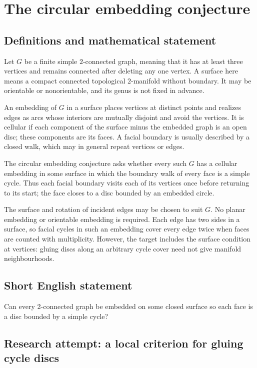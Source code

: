 \documentclass[11pt,a4paper]{article}
\begin{document}
\section*{The circular embedding conjecture}\label{statement}

\subsection{Definitions and mathematical statement}
Let $G$ be a finite simple $2$-connected graph, meaning that
it has at least three vertices and remains connected after
deleting any one vertex. A surface here means a compact
connected topological $2$-manifold without boundary. It may be
orientable or nonorientable, and its genus is not fixed in
advance.

An embedding of $G$ in a surface places vertices at distinct
points and realizes edges as arcs whose interiors are mutually
disjoint and avoid the vertices. It is cellular if each
component of the surface minus the embedded graph is an open
disc; these components are its faces. A facial boundary is
usually described by a closed walk, which may in general
repeat vertices or edges.

The circular embedding conjecture asks whether every such $G$
has a cellular embedding in some surface in which the boundary
walk of every face is a simple cycle. Thus each facial boundary
visits each of its vertices once before returning to its start;
the face closes to a disc bounded by an embedded circle.

The surface and rotation of incident edges may be chosen to
suit $G$. No planar embedding or orientable embedding is
required. Each edge has two sides in a surface, so facial
cycles in such an embedding cover every edge twice when faces
are counted with multiplicity. However, the target includes
the surface condition at vertices: gluing discs along an
arbitrary cycle cover need not give manifold neighbourhoods.
\subsection{Short English statement}
Can every 2-connected graph be embedded on some closed surface so each face is a disc bounded by a simple cycle?
\subsection{Research attempt: a local criterion for gluing cycle discs}
\end{document}
